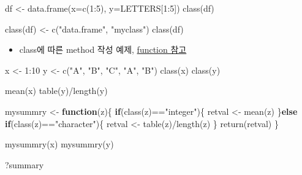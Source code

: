 \documentclass[
]{book}
\newenvironment{Shaded}{\begin{snugshade}}{\end{snugshade}}
\newcommand{\AttributeTok}[1]{\textcolor[rgb]{0.77,0.63,0.00}{#1}}
\newcommand{\ControlFlowTok}[1]{\textcolor[rgb]{0.13,0.29,0.53}{\textbf{#1}}}
\newcommand{\DecValTok}[1]{\textcolor[rgb]{0.00,0.00,0.81}{#1}}
\newcommand{\FunctionTok}[1]{\textcolor[rgb]{0.00,0.00,0.00}{#1}}
\newcommand{\NormalTok}[1]{#1}
\newcommand{\OtherTok}[1]{\textcolor[rgb]{0.56,0.35,0.01}{#1}}
\newcommand{\SpecialCharTok}[1]{\textcolor[rgb]{0.00,0.00,0.00}{#1}}
\newcommand{\StringTok}[1]{\textcolor[rgb]{0.31,0.60,0.02}{#1}}
\providecommand{\tightlist}{%
  \setlength{\itemsep}{0pt}\setlength{\parskip}{0pt}}
\begin{document}
\begin{Shaded}
\begin{Highlighting}[]

\NormalTok{df }\OtherTok{\textless{}{-}} \FunctionTok{data.frame}\NormalTok{(}\AttributeTok{x=}\FunctionTok{c}\NormalTok{(}\DecValTok{1}\SpecialCharTok{:}\DecValTok{5}\NormalTok{), }\AttributeTok{y=}\NormalTok{LETTERS[}\DecValTok{1}\SpecialCharTok{:}\DecValTok{5}\NormalTok{])}
\FunctionTok{class}\NormalTok{(df)}

\FunctionTok{class}\NormalTok{(df) }\OtherTok{\textless{}{-}} \FunctionTok{c}\NormalTok{(}\StringTok{"data.frame"}\NormalTok{, }\StringTok{"myclass"}\NormalTok{)}
\FunctionTok{class}\NormalTok{(df)}
\end{Highlighting}
\end{Shaded}

\begin{itemize}
\tightlist
\item
  class에 따른 method 작성 예제, \href{https://greendaygh.github.io/kribbr2022/r-programming.html\#functions}{function 참고}
\end{itemize}

\begin{Shaded}
\begin{Highlighting}[]

\NormalTok{x }\OtherTok{\textless{}{-}} \DecValTok{1}\SpecialCharTok{:}\DecValTok{10}
\NormalTok{y }\OtherTok{\textless{}{-}} \FunctionTok{c}\NormalTok{(}\StringTok{"A"}\NormalTok{, }\StringTok{"B"}\NormalTok{, }\StringTok{"C"}\NormalTok{, }\StringTok{"A"}\NormalTok{, }\StringTok{"B"}\NormalTok{)}
\FunctionTok{class}\NormalTok{(x)}
\FunctionTok{class}\NormalTok{(y)}

\FunctionTok{mean}\NormalTok{(x)}
\FunctionTok{table}\NormalTok{(y)}\SpecialCharTok{/}\FunctionTok{length}\NormalTok{(y)}

\NormalTok{mysummry }\OtherTok{\textless{}{-}} \ControlFlowTok{function}\NormalTok{(z)\{}
  \ControlFlowTok{if}\NormalTok{(}\FunctionTok{class}\NormalTok{(z)}\SpecialCharTok{==}\StringTok{"integer"}\NormalTok{)\{}
\NormalTok{    retval }\OtherTok{\textless{}{-}} \FunctionTok{mean}\NormalTok{(z)}
\NormalTok{  \}}\ControlFlowTok{else} \ControlFlowTok{if}\NormalTok{(}\FunctionTok{class}\NormalTok{(z)}\SpecialCharTok{==}\StringTok{"character"}\NormalTok{)\{}
\NormalTok{    retval }\OtherTok{\textless{}{-}} \FunctionTok{table}\NormalTok{(z)}\SpecialCharTok{/}\FunctionTok{length}\NormalTok{(z)}
\NormalTok{  \}}
  \FunctionTok{return}\NormalTok{(retval)}
\NormalTok{\}}


\FunctionTok{mysummry}\NormalTok{(x)}
\FunctionTok{mysummry}\NormalTok{(y)}

\NormalTok{?summary}
\end{Highlighting}
\end{Shaded}
\end{document}
